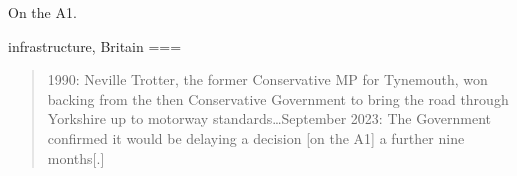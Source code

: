 On the A1.

infrastructure, Britain
===
\begin{quote}
1990: Neville Trotter, the former Conservative MP for Tynemouth, won backing from the then Conservative Government to bring the road through Yorkshire up to motorway standards…September 2023: The Government confirmed it would be delaying a decision [on the A1] a further nine months[.]
\end{quote}

\nocite{robinson2023}